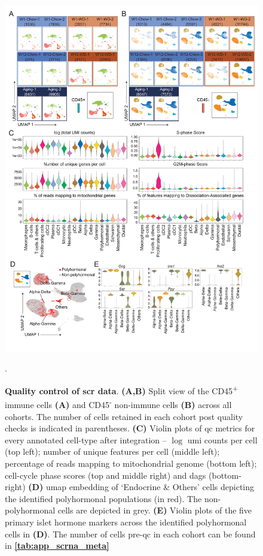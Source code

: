 \begin{figure}[H]
    \centering
    \includegraphics[width=13cm]{Appendix2/Fig/F2-A5-01.png}
    \caption[Quality control of  data]{\textbf{Quality control of \gls{scr} data}. 
    \textbf{(A,B)} Split view of the CD45\textsuperscript{+} immune cells \textbf{(A)} and CD45\textsuperscript{-} non-immune cells \textbf{(B)} across all cohorts. The number of cells retained in each cohort post quality checks is indicated in parentheses. \textbf{(C)} Violin plots of \gls{qc} metrics for every annotated cell-type after integration –  $\log$ \gls{umi} counts per cell (top left); number of unique features per cell (middle left); percentage of reads mapping to mitochondrial genome (bottom left); cell-cycle phase scores (top and middle right) and \glspl{dag} (bottom-right) \textbf{(D)} \gls{umap} embedding of `Endocrine \& Others' cells depicting the identified polyhormonal populations (in red). The non-polyhormonal cells are depicted in grey. \textbf{(E)} Violin plots of the five primary islet hormone markers across the identified polyhormonal cells in \textbf{(D)}. The number of cells pre-\gls{qc} in each cohort can be found in \textbf{\autoref{tab:app_scrna_meta}}}.
    \label{fig:app_scrna_qc}
\end{figure}

